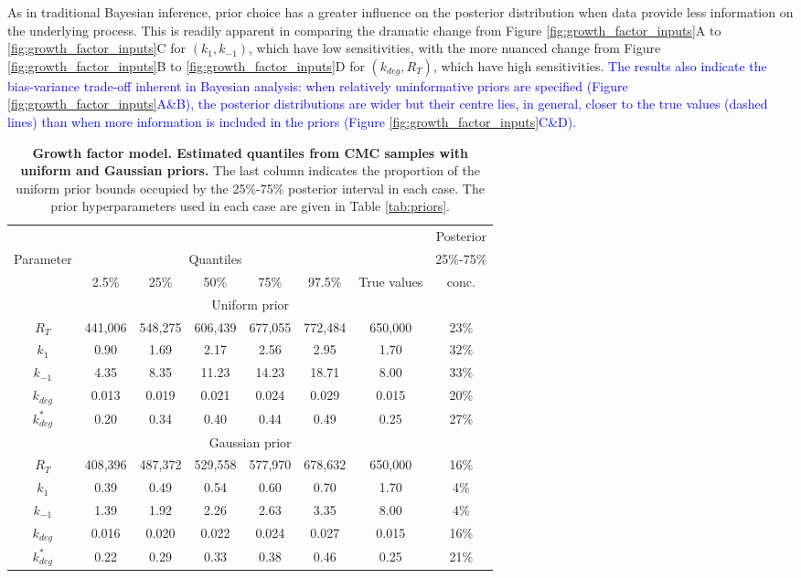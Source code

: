 As in traditional Bayesian inference, prior choice has a greater influence on the posterior distribution when data provide less information on the underlying process. This is readily apparent in comparing the dramatic change from Figure \ref{fig:growth_factor_inputs}A to \ref{fig:growth_factor_inputs}C for $(k_1,k_{-1})$, which have low sensitivities, with the more nuanced change from Figure \ref{fig:growth_factor_inputs}B to \ref{fig:growth_factor_inputs}D for $(k_{deg},R_T)$, which have high sensitivities. \textcolor{blue}{The results also indicate the bias-variance trade-off inherent in Bayesian analysis: when relatively uninformative priors are specified (Figure \ref{fig:growth_factor_inputs}A\&B), the posterior distributions are wider but their centre lies, in general, closer to the true values (dashed lines) than when more information is included in the priors (Figure \ref{fig:growth_factor_inputs}C\&D).}

\begin{table}
	\scriptsize
\begin{tabular}{c|ccccc|c|c}
\toprule
&&&&&&&                                         Posterior \\
Parameter &  \multicolumn{5}{c}{Quantiles} &&  25\%-75\% \\
          & 2.5\% & 25\% & 50\% & 75\% & 97.5\% & True values & conc.\\
\toprule
\multicolumn{8}{c}{Uniform prior} \\
\toprule
$R_T$       &  441,006 & 548,275 & 606,439 & 677,055 & 772,484 & 650,000 & 23\%\\
$k_1$       &  0.90 & 1.69 & 2.17 & 2.56 & 2.95 & 1.70 & 32\%\\
$k_{-1}$    & 4.35 & 8.35 & 11.23 & 14.23 & 18.71 & 8.00 & 33\%\\
$k_{deg}$   & 0.013 & 0.019 & 0.021 & 0.024 & 0.029 & 0.015 & 20\%\\
$k^*_{deg}$ & 0.20 & 0.34 & 0.40 & 0.44 & 0.49 & 0.25 & 27\%\\
\toprule
\multicolumn{8}{c}{Gaussian prior} \\
\toprule
$R_T$       & 408,396 & 487,372 & 529,558 & 577,970 & 678,632 & 650,000 & 16\%\\
$k_1$       & 0.39 & 0.49 & 0.54 & 0.60 & 0.70 & 1.70 & 4\%\\
$k_{-1}$    & 1.39 & 1.92 & 2.26 & 2.63 & 3.35 & 8.00 & 4\%\\
$k_{deg}$   & 0.016 & 0.020 & 0.022 & 0.024 & 0.027 & 0.015 & 16\%\\
$k^*_{deg}$ & 0.22 & 0.29 & 0.33 & 0.38 & 0.46 & 0.25 & 21\%\\
\end{tabular}
\caption{\textbf{Growth factor model. Estimated quantiles from CMC samples with uniform and Gaussian priors.} The last column indicates the proportion of the uniform prior bounds occupied by the 25\%-75\% posterior interval in each case. The prior hyperparameters used in each case are given in Table \ref{tab:priors}.}
\label{tab:growth_factor_results}
\end{table}

